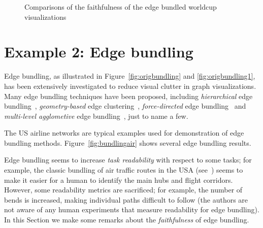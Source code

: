 \documentclass[10pt,journal,cspaper,compsoc]{IEEEtran}
\begin{document}
\begin{figure*}\centering
{}\hspace{1.7cm}
\caption{Comparisons of the faithfulness of the edge bundled worldcup visualizations}\label{fig:worldcup_faithcompare}
\end{figure*}

\section{Example 2: Edge bundling\label{sec:vizbundling}}

Edge bundling, as illustrated in Figure~\ref{fig:origbundling} and \ref{fig:origbundling1}, has been extensively investigated to reduce visual clutter in graph visualizations. Many edge bundling techniques have been proposed, including \emph{hierarchical} edge bundling~\cite{holten2006hierarchical}, \emph{geometry-based} edge clustering~\cite{holten2006hierarchical,zhou2008energy,lambert2010winding}, \emph{force-directed} edge bundling~\cite{holten} and \emph{multi-level agglometive} edge bundling~\cite{gansner2011multilevel}, just to name a few.


The US airline networks are typical examples used for demonstration of edge bundling methods. Figure~\ref{fig:bundlingair} shows several edge bundling results.


Edge bundling seems to increase \emph{task readability} with respect to some tasks; for example, the classic bundling of air traffic routes in the USA (see~\cite{holten,telea2010image}) seems to make it easier for a human to identify the main hubs and flight corridors. However, some readability metrics are sacrificed; for example, the number of bends is increased, making individual paths difficult to follow (the authors are not aware of any human experiments that measure readability for edge bundling). In this Section we make some remarks about the \emph{faithfulness} of edge bundling.
\end{document}
